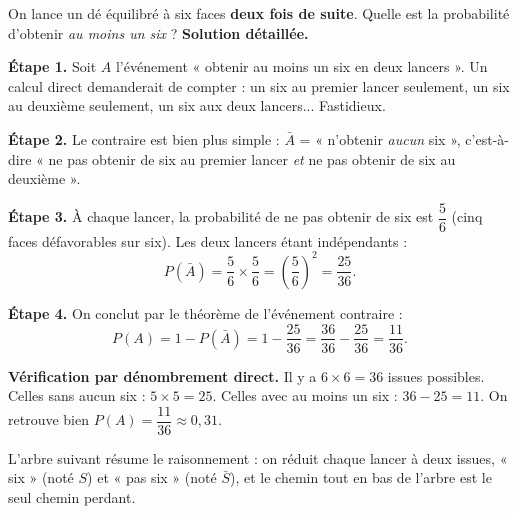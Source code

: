 \documentclass[11pt]{article}
\begin{document}
\begin{exoresolu}
On lance un dé équilibré à six faces \textbf{deux fois de suite}. Quelle est la probabilité d'obtenir \emph{au moins un six} ?
\tcblower
\textbf{Solution détaillée.}

\textbf{Étape 1.} Soit $A$ l'événement « obtenir au moins un six en deux lancers ». Un calcul direct demanderait de compter : un six au premier lancer seulement, un six au deuxième seulement, un six aux deux lancers... Fastidieux.

\textbf{Étape 2.} Le contraire est bien plus simple : $\bar{A}$ = « n'obtenir \emph{aucun} six », c'est-à-dire « ne pas obtenir de six au premier lancer \emph{et} ne pas obtenir de six au deuxième ».

\textbf{Étape 3.} À chaque lancer, la probabilité de ne pas obtenir de six est $\dfrac{5}{6}$ (cinq faces défavorables sur six). Les deux lancers étant indépendants :
\[ P(\bar{A}) = \frac{5}{6} \times \frac{5}{6} = \left(\frac{5}{6}\right)^2 = \frac{25}{36}. \]

\textbf{Étape 4.} On conclut par le théorème de l'événement contraire :
\[ P(A) = 1 - P(\bar{A}) = 1 - \frac{25}{36} = \frac{36}{36} - \frac{25}{36} = \frac{11}{36}. \]

\textbf{Vérification par dénombrement direct.} Il y a $6 \times 6 = 36$ issues possibles. Celles sans aucun six : $5 \times 5 = 25$. Celles avec au moins un six : $36 - 25 = 11$. On retrouve bien $P(A) = \dfrac{11}{36} \approx 0{,}31$.
\end{exoresolu}

L'arbre suivant résume le raisonnement : on réduit chaque lancer à deux issues, « six » (noté $S$) et « pas six » (noté $\bar{S}$), et le chemin tout en bas de l'arbre est le seul chemin perdant.
\end{document}
